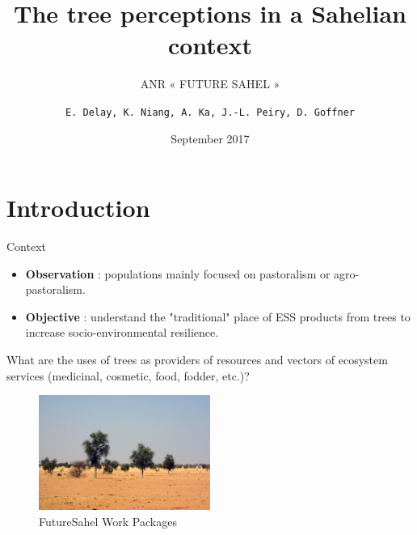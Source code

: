 \documentclass[newPxFont]{beamer}
\title{The tree perceptions in a Sahelian context}
\subtitle{ANR « FUTURE SAHEL »}
\date{September 2017}
\author{\texttt{E. Delay,  K. Niang, A. Ka, J.-L. Peiry, D. Goffner}}
\institute{Presentation at Stockholm Resilience Center}
\begin{document}
%
%

\maketitle


%
%


\section{Introduction}

\begin{frame}[c]{Context}
\vspace{-1cm}
\begin{itemize}
  \item \textbf{Observation} : populations mainly focused on pastoralism or agro-pastoralism.
  \item \textbf{Objective} : understand the "traditional" place of ESS products from trees to increase socio-environmental resilience.
\end{itemize}

What are the uses of trees as providers of resources and vectors of ecosystem services (medicinal, cosmetic, food, fodder, etc.)?

\begin{figure}
	\centering
	\includegraphics[width = 0.5\textwidth]{img/2007_Podor.JPG}
	\caption{FutureSahel Work Packages}
\end{figure}
\end{frame}
\end{document}

